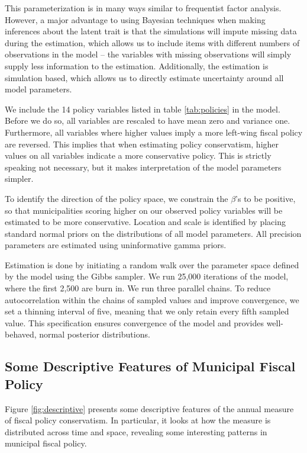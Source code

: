 \documentclass[a4paper,12pt]{article}
\begin{document}
This parameterization is in many ways similar to frequentist factor analysis. However, a major advantage to using Bayesian techniques when making inferences about the latent trait is that the simulations will impute missing data during the estimation, which allows us to include items with different numbers of observations in the model -- the variables with missing observations will simply supply less information to the estimation. Additionally, the estimation is simulation based, which allows us to directly estimate uncertainty around all model parameters. 

We include the 14 policy variables listed in table  \ref{tab:policies} in the model. Before we do so, all variables are rescaled to have mean zero and variance one. Furthermore, all variables where higher values imply a more left-wing fiscal policy are reversed. This implies that when estimating policy conservatism, higher values on all variables indicate a more conservative policy. This is strictly speaking not necessary, but it makes interpretation of the model parameters simpler.

To identify the direction of the policy space, we constrain the $\beta$'s to be positive, so that municipalities scoring higher on our observed policy variables will be estimated to be more conservative. Location and scale is identified by placing standard normal priors on the distributions of all model parameters. All precision parameters are estimated using uninformative gamma priors.

Estimation is done by initiating a random walk over the parameter space defined by the model using the Gibbs sampler. We run 25,000 iterations of the model, where the first 2,500 are burn in. We run three parallel chains. To reduce autocorrelation within the chains of sampled values and improve convergence, we set a thinning interval of five, meaning that we only retain every fifth sampled value. This specification ensures  convergence of the model and provides well-behaved, normal posterior distributions.

\clearpage

\subsection{Some Descriptive Features of Municipal Fiscal Policy} \label{descriptives}

Figure \ref{fig:descriptive} presents some descriptive features of the annual measure of fiscal policy conservatism. In particular, it looks at how the measure is distributed across time and space, revealing some interesting patterns in municipal fiscal policy.
\end{document}
